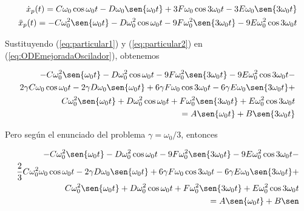 \documentclass[a4paper,10pt]{article}
\numberwithin{equation}{section}
\begin{document}
\begin{align}
 \begin{split}
  \dot{x}_p (t) = C \omega_0 \cos{\omega_0t} - D\omega_0 \sen{\omega_0t} + 
  3F\omega_0 \cos{3 \omega_0t} - 3E\omega_0 \sen{3 \omega_0t} \\
  \ddot{x}_p (t) = - C\omega_0^2 \sen{\omega_0t} - D\omega_0^2 \cos{\omega_0t} - 
  9F\omega_0^2 \sen{3 \omega_0t} - 9E\omega_0^2 \cos{3 \omega_0t} 
  \label{eq:particular2}
 \end{split}
\end{align}

Sustituyendo (\ref{eq:particular1}) y (\ref{eq:particular2}) en (\ref{eq:ODEmejoradaOscilador}),
obtenemos

\begin{align*}
%
 - C\omega_0^2 \sen{\omega_0t} - D\omega_0^2 \cos{\omega_0t} - 
  9F\omega_0^2 \sen{3 \omega_0t} - 9E\omega_0^2 \cos{3 \omega_0t} - \\
  2\gamma C \omega_0 \cos{\omega_0t} - 2\gamma D\omega_0 \sen{\omega_0t} + 
  6\gamma F\omega_0 \cos{3 \omega_0t} - 6\gamma E\omega_0 \sen{3 \omega_0t} + \\
  C\omega_0^2 \sen{\omega_0t} + D\omega_0^2 \cos{\omega_0t} + F\omega_0^2 
  \sen{3 \omega_0t} + E\omega_0^2 \cos{3 \omega_0t} \\
  = A \sen{\omega_0t} + B \sen{3\omega_0t}
\end{align*}

Pero según el enunciado del problema $\gamma = \omega_0/3$, entonces

\begin{align}
 \begin{split}
- C\omega_0^2 \sen{\omega_0t} - D\omega_0^2 \cos{\omega_0t} - 
  9F\omega_0^2 \sen{3 \omega_0t} - 9E\omega_0^2 \cos{3 \omega_0t} - \\
  \frac{2}{3} C \omega_0^2 \omega_0 \cos{\omega_0t} - 2\gamma D\omega_0 \sen{\omega_0t} + 
  6\gamma F\omega_0 \cos{3 \omega_0t} - 6\gamma E\omega_0 \sen{3 \omega_0t} + \\
  C\omega_0^2 \sen{\omega_0t} + D\omega_0^2 \cos{\omega_0t} + F\omega_0^2 
  \sen{3 \omega_0t} + E\omega_0^2 \cos{3 \omega_0t} \\
  = A \sen{\omega_0t} + B \sen
  \end{split}
\end{align}
\end{document}
